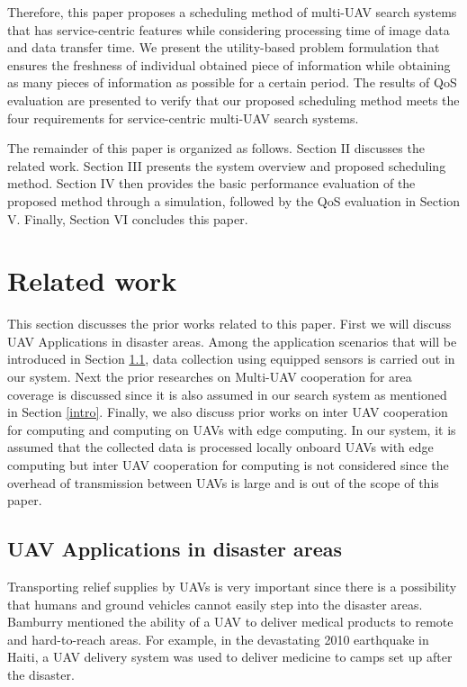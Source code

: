 \documentclass{ieeeaccess}
\begin{document}
Therefore, this paper proposes a scheduling method of multi-UAV search systems that has service-centric features while considering processing time of image data and data transfer time.
We present the utility-based problem formulation that ensures the freshness of individual obtained piece of information while obtaining as many pieces of information as possible for a certain period.
The results of QoS evaluation are presented to verify that our proposed scheduling method meets the four requirements for service-centric multi-UAV search systems.

The remainder of this paper is organized as follows. Section II discusses the related work. Section III presents the system overview and proposed scheduling method. Section IV then provides the basic performance evaluation of the proposed method through a simulation, followed by the QoS evaluation in Section V. Finally, Section VI concludes this paper.
%
%
\section{Related work}
This section discusses the prior works related to this paper.
First we will discuss UAV Applications in disaster areas. 
Among the application scenarios that will be introduced in Section \ref{app}, data collection using equipped sensors is carried out in our system.
Next the prior researches on Multi-UAV cooperation for area coverage is discussed since it is also assumed in our search system as mentioned in Section \ref{intro}.
Finally, we also discuss prior works on inter UAV cooperation for computing and  computing on UAVs with edge computing.
In our system, it is assumed that the collected data is processed locally onboard UAVs with edge computing but inter UAV cooperation for computing is not considered since the overhead of transmission between UAVs is large and is out of the scope of this paper.

\subsection{UAV Applications in disaster areas}\label{app}
Transporting relief supplies by UAVs is very important since there is a possibility that humans and ground vehicles cannot easily step into the disaster areas.
Bamburry mentioned the ability of a UAV to deliver medical products to remote and hard-to-reach areas\cite{Bamburry2015}.
For example, in the devastating 2010 earthquake in Haiti, a UAV delivery system was used to deliver medicine to camps set up after the disaster\cite{May2015}.
\end{document}

